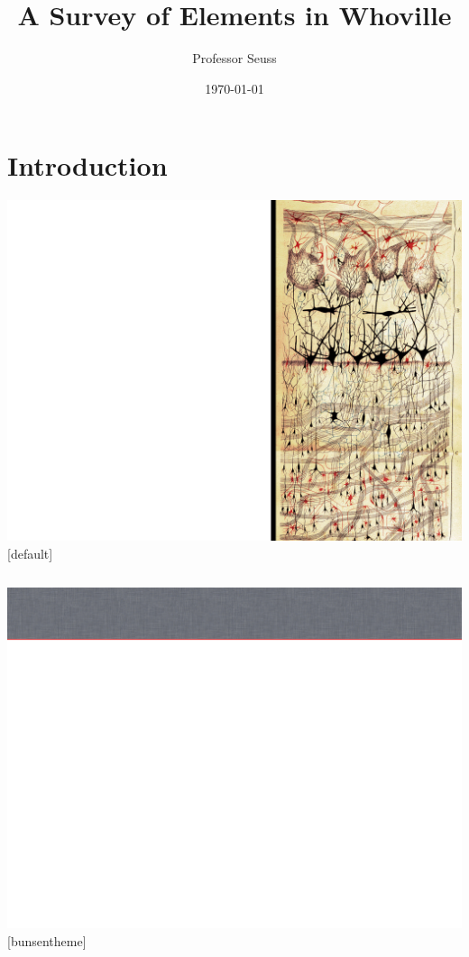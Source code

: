 \documentclass{beamer}
\title{A Survey of Elements in Whoville}
\author{Professor Seuss}
\institute[The Institute of Advanced Study]
{
Department of Chemistry \\
Whoville College \\
}
\date{\today}
\begin{document}
\section{Introduction}
{\includegraphics[width=\paperwidth,height=\paperheight]{frontpage_bg}}
[default]

\begin{frame}
\vspace{2cm}
\begin{columns}
\column{2.75in}
  \titlepage
  \vspace{10cm}
\column{2.0in}
\end{columns}
\end{frame}

%
 {\includegraphics[width=\paperwidth,height=\paperheight]{slide_bg}}
[bunsentheme]
\end{document}
